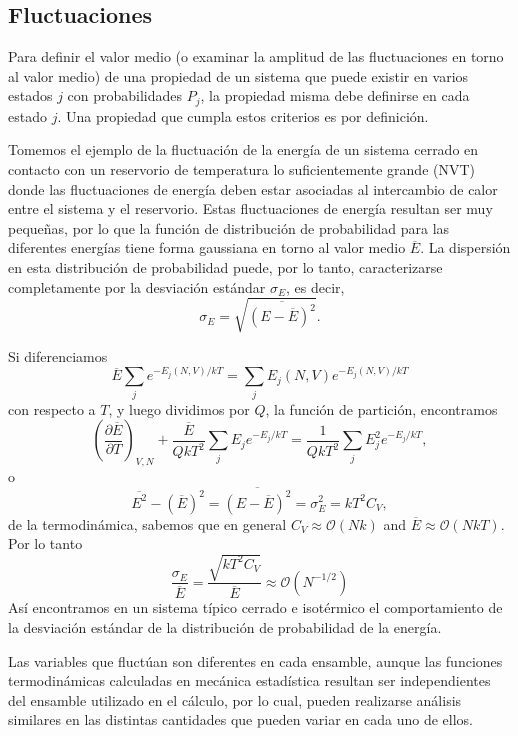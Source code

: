 \subsection{Fluctuaciones}

Para definir el valor medio (o examinar la amplitud de las fluctuaciones en torno 
al valor medio) de una propiedad de un sistema que puede existir en varios estados
$j$ con probabilidades $P_j$, la propiedad misma debe definirse en cada estado 
$j$. Una propiedad que cumpla estos criterios es  por definición.

Tomemos el ejemplo de la fluctuación de la energía de un sistema cerrado en 
contacto con un reservorio de temperatura lo suficientemente grande (NVT) donde 
las fluctuaciones de energía deben estar asociadas al intercambio de calor entre 
el sistema y el reservorio. Estas fluctuaciones de energía resultan ser muy 
pequeñas, por lo que la función de distribución de probabilidad para las 
diferentes energías tiene forma gaussiana en torno al valor medio $\overline{E}$. 
La dispersión en esta distribución de probabilidad puede, por lo tanto,
caracterizarse completamente por la desviación estándar $\sigma_E$, es decir, 
$$
\sigma_E = \sqrt{\overline{(E - \overline{E})^2}}.
$$

Si diferenciamos
$$
\overline{E} \sum_j e^{-E_j(N,V)/kT} = \sum_j E_j(N,V) e^{-E_j(N,V)/kT}
$$
con respecto a $T$, y luego dividimos por $Q$, la función de partición, encontramos
$$
\left(\frac{\partial\overline{E}}{\partial T}\right)_{V,N} + \frac{\overline{E}}{Q kT^2} \sum_j E_j e^{-E_j / kT} = \frac{1}{Q kT^2} \sum_j E_j^2 e^{-E_j/kT},
$$
o
$$
\overline{E^2} - (\overline{E})^2 = \overline{(E-\overline{E})^2} = \sigma_E^2 = k T^2 C_V,
$$
de la termodinámica, sabemos que en general $C_V \approx \mathcal{O}(Nk)$ and $\overline{E} \approx \mathcal{O}(NkT)$. Por lo tanto
\begin{equation}\label{eq:fluctuaciones}
    \frac{\sigma_E}{\overline{E}} = \frac{\sqrt{kT^2C_V}}{\overline{E}} \approx \mathcal{O}(N^{-1/2})
\end{equation}
Así encontramos en un sistema típico cerrado e isotérmico el comportamiento de la
desviación estándar de la distribución de probabilidad de la energía.

Las variables que fluctúan son diferentes en cada ensamble, aunque las funciones 
termodinámicas calculadas en mecánica estadística resultan ser independientes del 
ensamble utilizado en el cálculo, por lo cual, pueden realizarse análisis 
similares en las distintas cantidades que pueden variar en cada uno de ellos.

